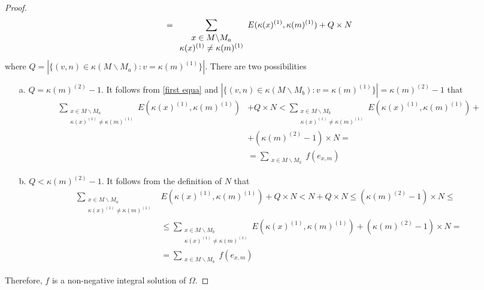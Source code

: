 \documentclass{article}
\theoremstyle{definition}
\newcommand\downn[2]{e_{#1,#2}}
\newcommand\set[1]{\{ #1 \}}
\begin{document}
\begin{proof}
\begin{align}
\notag &=\underset{ \begin{array}{c} x \in M\backslash M_a \\ \kappa(x)^{(1)}\neq \kappa(m)^{(1)}  \end{array}  }{\sum}E(\kappa(x)^{(1)},\kappa(m)^{(1)})+Q\times N
\end{align}
where $Q=| \set{(v,n)\in \kappa(M\backslash M_a): v=\kappa(m)^{(1)}} |$. There are two possibilities
\begin{itemize}
  \item[a. ]$Q=\kappa(m)^{(2)}-1$. It follows from \eqref{first equa} and $|\set{(v,n)\in \kappa(M\backslash M_b):v=\kappa(m)^{(1)}}|=\kappa(m)^{(2)}-1$ that 
\begin{align*}
\underset{ \begin{array}{c} x \in M\backslash M_a \\ \kappa(x)^{(1)}\neq \kappa(m)^{(1)}  \end{array}  }{\sum}E(\kappa(x)^{(1)},\kappa(m)^{(1)})&+Q\times N< \underset{\begin{array}{c}x\in M\backslash M_b \\ \kappa(x)^{(1)}\neq \kappa(m)^{(1)}  \end{array}}{\sum}E(\kappa(x)^{(1)},\kappa(m)^{(1)})+\\
&+(\kappa(m)^{(2)}-1)\times N=\\
&=\underset{
\begin{array}{c}
x \in M\backslash M_b
\end{array}
}{\sum} f(\downn{x}{m})
\end{align*}
\item[b. ] $Q<\kappa(m)^{(2)}-1$. It follows from the definition of $N$ that 
\begin{align*}
\underset{ \begin{array}{c} x \in M\backslash M_a \\ \kappa(x)^{(1)}\neq \kappa(m)^{(1)}  \end{array}  }{\sum}&E(\kappa(x)^{(1)},\kappa(m)^{(1)})+Q\times N<N+Q\times N\leq (\kappa(m)^{(2)}-1)\times N\leq \\
&\leq  \underset{\begin{array}{c}x\in M\backslash M_b \\ \kappa(x)^{(1)}\neq \kappa(m)^{(1)}  \end{array}}{\sum}E(\kappa(x)^{(1)},\kappa(m)^{(1)})+(\kappa(m)^{(2)}-1)\times N=\\
&=\underset{
\begin{array}{c}
x \in M\backslash M_b
\end{array}}{\sum} f(\downn{x}{m})
\end{align*}
\end{itemize}  
Therefore, $f$ is a non-negative integral solution of $\Omega$.
\end{proof}
\end{document}
